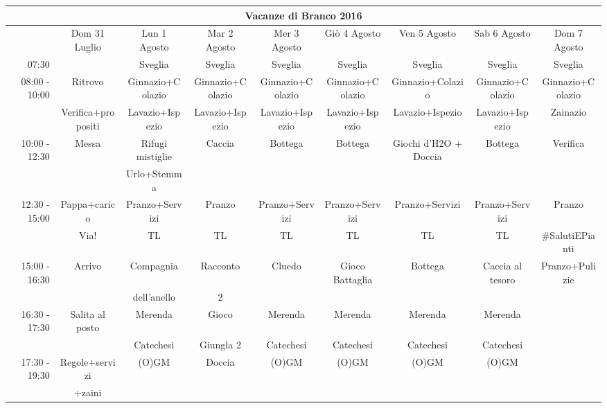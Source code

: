 \documentclass[a4paper]{article}
\begin{document}
\begin{landscape}
\begin{adjustwidth}{-2.5cm}{-1cm}%
 \begin{tabular}{|r|c|c|c|c|c|c|c|c|}
 \hline
 \multicolumn{9}{|c|}{Vacanze di Branco 2016}\\
 \hline
        &Dom 31 Luglio&Lun 1 Agosto&Mar 2 Agosto&Mer 3 Agosto&Giò 4 Agosto&Ven 5 Agosto&Sab 6 Agosto&Dom 7 Agosto\\ \hline
        07:30& &Sveglia&Sveglia&Sveglia&Sveglia&Sveglia&Sveglia&Sveglia\\ \hline
        
        \multirow{2}{*}{08:00 - 10:00}&Ritrovo&Ginnazio+Colazio&Ginnazio+Colazio&Ginnazio+Colazio&Ginnazio+Colazio&Ginnazio+Colazio&Ginnazio+Colazio&Ginnazio+Colazio\\
        &Verifica+propositi&Lavazio+Ispezio&Lavazio+Ispezio&Lavazio+Ispezio&Lavazio+Ispezio&Lavazio+Ispezio&Lavazio+Ispezio&Zainazio\\ \hline
        
        \multirow{2}{*}{10:00 - 12:30}&Messa&Rifugi mistiglie&Caccia&Bottega&Bottega&Giochi d'H2O + Doccia&Bottega&Verifica\\
        & &Urlo+Stemma& & & & & &\\ \hline
        
        \multirow{2}{*}{12:30 - 15:00}&Pappa+carico&Pranzo+Servizi&Pranzo&Pranzo+Servizi&Pranzo+Servizi&Pranzo+Servizi&Pranzo+Servizi&Pranzo\\&Via!&TL&TL&TL&TL&TL&TL&\#SalutiEPianti\\ \hline
    
        \multirow{2}{*}{15:00 - 16:30}&Arrivo&Compagnia&Racconto&Cluedo&Gioco Battaglia&Bottega&Caccia al tesoro&Pranzo+Pulizie\\& &dell'anello&2& & & & &\\ \hline
        
    
        \multirow{2}{*}{16:30 - 17:30}&Salita al posto&Merenda&Gioco&Merenda&Merenda&Merenda&Merenda&\\& &Catechesi&Giungla 2&Catechesi&Catechesi&Catechesi&Catechesi&\\ \hline
        \multirow{2}{*}{17:30 - 19:30}&Regole+servizi&(O)GM&Doccia&(O)GM&(O)GM&(O)GM&(O)GM&\\&+zaini& & & & & & &\\ \hline
        

\end{tabular}
\end{adjustwidth}
\end{landscape}
\end{document}
